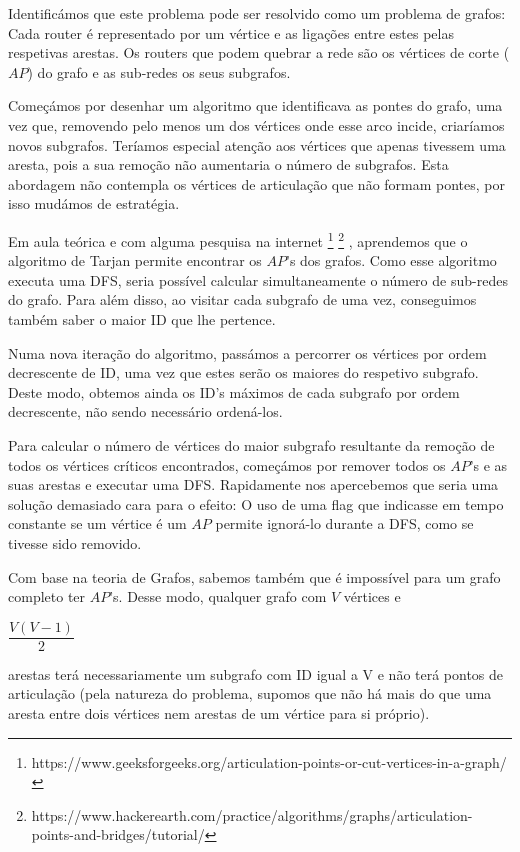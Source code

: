 \documentclass[12pt]{article}
\begin{document}
    \par
    Identificámos que este problema pode ser resolvido como um problema de grafos:
    Cada router é representado por um vértice e as ligações entre estes pelas respetivas 
    arestas. Os routers que podem quebrar a rede são os vértices de corte ($AP$)
    do grafo e as sub-redes os seus subgrafos.
    \par\bigskip
    Começámos por desenhar um algoritmo que identificava as pontes do grafo, uma vez
    que, removendo pelo menos um dos vértices onde esse arco incide, criaríamos novos 
    subgrafos. Teríamos especial atenção aos vértices que apenas tivessem uma aresta,
    pois a sua remoção não aumentaria o número de subgrafos. Esta abordagem não contempla
    os vértices de articulação que não formam pontes, por isso mudámos de estratégia.
    \par
    Em aula teórica e com alguma pesquisa na internet
    \footnote{https://www.geeksforgeeks.org/articulation-points-or-cut-vertices-in-a-graph/}
    \footnote{https://www.hackerearth.com/practice/algorithms/graphs/articulation-points-and-bridges/tutorial/}
    , aprendemos que o algoritmo de 
    Tarjan permite encontrar os $AP$'s dos grafos. Como esse algoritmo executa uma DFS, 
    seria possível calcular simultaneamente o número de sub-redes do grafo. Para além disso,
    ao visitar cada subgrafo de uma vez, conseguimos também saber o maior ID que lhe pertence.
    \par
    Numa nova iteração do algoritmo, passámos a percorrer os vértices por ordem decrescente de 
    ID, uma vez que estes serão os maiores do respetivo subgrafo. Deste modo, obtemos ainda os 
    ID's máximos de cada subgrafo por ordem decrescente, não sendo necessário ordená-los.
    \par
    Para calcular o número de vértices do maior subgrafo resultante da 
    remoção de todos os vértices críticos encontrados, começámos por  
    remover todos os $AP$'s e as suas arestas e executar uma DFS.
    Rapidamente nos apercebemos que seria uma solução demasiado cara para o efeito: O uso de uma
    flag que indicasse em tempo constante se um vértice é um $AP$ permite ignorá-lo durante a DFS,
    como se tivesse sido removido.
    
    \par\bigskip
    Com base na teoria de Grafos, sabemos também que é impossível para um grafo completo ter 
    $AP$'s. Desse modo, qualquer grafo com $V$ vértices e 
    \begin{small}$\dfrac{V(V-1)}{2}$\end{small} arestas
    terá necessariamente um subgrafo com ID igual a V e não terá pontos de articulação
    (pela natureza do problema, supomos que não há mais do que uma aresta entre dois vértices
    nem arestas de um vértice para si próprio).
\end{document}
